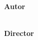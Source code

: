 \begin{titlepage}
    \begin{addmargin}[-1cm]{-3cm}
    \begin{center}
        \large

        \hfill

        \vfill


        \begingroup
            \color{Maroon}\spacedallcaps{\LARGE\myTitle} \\ \bigskip
        \endgroup

        \vfill

        \textbf{Autor} \\
        \myName \\ \medskip

        \textbf{Director} \\
        \myProf \\ \medskip

    \end{center}
  \end{addmargin}
\end{titlepage}

%
%
%
%
